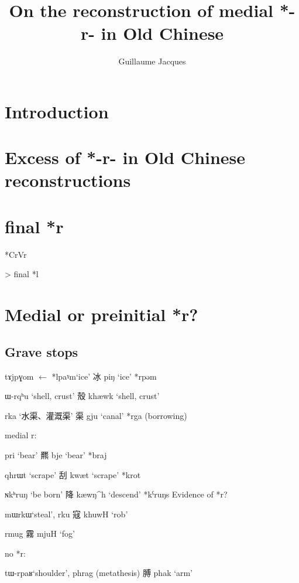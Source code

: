 \documentclass[oldfontcommands,oneside,a4paper,11pt]{article}
\newcommand{\ipa}[1]{{\phon \mbox{#1}}} %
\newcommand{\zh}[1]{{\cn #1}}
\newcommand{\ch}[3]{\zh{#1} \ipa{#2} `#3'}
\begin{document}
 
\title{On the reconstruction of medial *-r- in Old Chinese}
\author{Guillaume Jacques}
\maketitle
 

\section{Introduction}


\citet{handel02r}

\section{Excess of *-r- in Old Chinese reconstructions}

\section{final *r}
*CrVr

> final *\ipa{l}

\section{Medial or preinitial *r?}


\subsection{Grave stops}



\ipa{tɤjpɣom} $\leftarrow$ *\ipa{lpaˠm}`ice' \ch{冰}{piŋ}{ice} *\ipa{rpəm}

\ipa{ɯ-rqʰu} `shell, crust' \ch{殼}{khæwk}{shell, crust}

\ipa{rka} `\zh{水渠、灌溉渠}' \ch{渠}{gju}{canal} *rga (borrowing)


medial r:

\ipa{pri} `bear' \ch{羆}{bje}{bear} *braj

\ipa{qhrɯt} `scrape' \ch{刮}{kwæt}{scrape} *krot


\ipa{ɴkʰruŋ} `be born' \ch{降}{kæwŋ^h}{descend} *kˁruŋs
Evidence of *r?

\ipa{mɯrkɯ}`steal', \ipa{rku} \ch{寇}{khuwH}{rob} 

rmug \ch{霧}{mjuH}{fog}


no *r:

\ipa{tɯ-rpaʁ}`shoulder', \ipa{phrag} (metathesis) \ch{膊}{phak}{arm}
\end{document}
